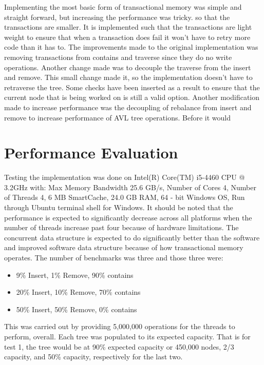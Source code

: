 \documentclass[conference]{IEEEtran}
\theoremstyle{definition}
\theoremstyle{theorem}
\begin{document}
Implementing the most basic form of transactional memory was simple and straight forward, but increasing the performance was tricky. so that the transactions are smaller. It is implemented such that the transactions are light weight to ensure that when a transaction does fail it won't have to retry more code than it has to. The improvements made to the original implementation was removing transactions from contains and traverse since they do no write operations. Another change made was to decouple the traverse from the insert and remove. This small change made it, so the implementation doesn't have to retraverse the tree. Some checks have been inserted as a result to ensure that the current node that is being worked on is still a valid option. Another modification made to increase performance was the decoupling of rebalance from insert and remove to increase performance of AVL tree operations. Before it would


\section{Performance Evaluation}
Testing the implementation was done on Intel(R) Core(TM) i5-4460 CPU @ 3.2GHz with: Max Memory Bandwidth 25.6 GB/s, Number of Cores 4, Number of Threads 4, 6 MB SmartCache, 24.0 GB RAM, 64 - bit Windows OS, Run through Ubuntu terminal shell for Windows. It should be noted that the performance is expected to significantly decrease across all platforms when the number of threads increase past four because of hardware limitations. The concurrent data structure is expected to do significantly better than the software and improved software data structure because of how transactional memory operates. The number of benchmarks was three and those three were:
\begin{itemize}
\item 9\% Insert, 1\% Remove, 90\% contains
\item 20\% Insert, 10\% Remove, 70\% contains
\item 50\% Insert, 50\% Remove, 0\% contains
\end{itemize}
This was carried out by providing 5,000,000 operations for the threads to perform, overall. Each tree was populated to its expected capacity. That is for test 1, the tree would be at 90\% expected capacity or 450,000 nodes, 2/3 capacity, and 50\% capacity, respectively for the last two.
\end{document}
